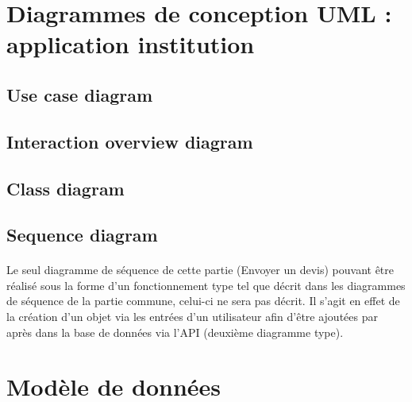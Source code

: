 \documentclass[]{report}
\begin{document}
\newpage



\section{Diagrammes de conception UML : application institution}



\subsection{Use case diagram}



\newpage

\subsection{Interaction overview diagram}



\newpage

\subsection{Class diagram}



\newpage

\subsection{Sequence diagram}

\paragraph{}Le seul diagramme de séquence de cette partie (Envoyer un devis) pouvant être réalisé sous la forme d’un fonctionnement type tel que décrit dans les diagrammes de séquence de la partie commune, celui-ci ne sera pas décrit. Il s’agit en effet de la création d’un objet via les entrées d’un utilisateur afin d’être ajoutées par après dans la base de données via l’API (deuxième diagramme type).

\newpage

\section{Modèle de données}
\end{document}
